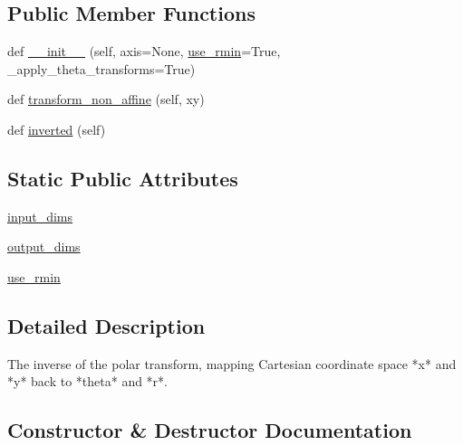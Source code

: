 \subsection*{Public Member Functions}
\begin{DoxyCompactItemize}
\item 
def \hyperlink{classmatplotlib_1_1projections_1_1polar_1_1InvertedPolarTransform_a3937d6aee5b5abd8292721b778e4e787}{\+\_\+\+\_\+init\+\_\+\+\_\+} (self, axis=None, \hyperlink{classmatplotlib_1_1projections_1_1polar_1_1InvertedPolarTransform_ac653ae9eeab6a6114a36273b16354689}{use\+\_\+rmin}=True, \+\_\+apply\+\_\+theta\+\_\+transforms=True)
\item 
def \hyperlink{classmatplotlib_1_1projections_1_1polar_1_1InvertedPolarTransform_a206f32d4d2efc3417f829e1d2cd7737d}{transform\+\_\+non\+\_\+affine} (self, xy)
\item 
def \hyperlink{classmatplotlib_1_1projections_1_1polar_1_1InvertedPolarTransform_a4892a49c75223e56208ce5fa07e953e7}{inverted} (self)
\end{DoxyCompactItemize}
\subsection*{Static Public Attributes}
\begin{DoxyCompactItemize}
\item 
\hyperlink{classmatplotlib_1_1projections_1_1polar_1_1InvertedPolarTransform_accc2d29e87dccd10f68b7adbd966777f}{input\+\_\+dims}
\item 
\hyperlink{classmatplotlib_1_1projections_1_1polar_1_1InvertedPolarTransform_ad2fbafd7e2c494849a4a67f960bbd7c6}{output\+\_\+dims}
\item 
\hyperlink{classmatplotlib_1_1projections_1_1polar_1_1InvertedPolarTransform_ac653ae9eeab6a6114a36273b16354689}{use\+\_\+rmin}
\end{DoxyCompactItemize}


\subsection{Detailed Description}
\begin{DoxyVerb}The inverse of the polar transform, mapping Cartesian
coordinate space *x* and *y* back to *theta* and *r*.
\end{DoxyVerb}
 

\subsection{Constructor \& Destructor Documentation}
\mbox{\label{classmatplotlib_1_1projections_1_1polar_1_1InvertedPolarTransform_a3937d6aee5b5abd8292721b778e4e787}} 
